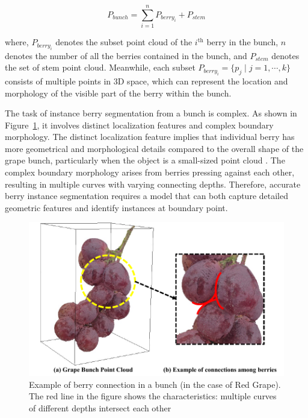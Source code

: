 \documentclass[12pt]{article}
\begin{document}
\begin{equation}
P_{bunch} = \sum_{i=1}^{n} P_{berry_{i}} + P_{stem}
\label{eq:1}
\end{equation}

{\raggedright where, $P_{berry_{i}}$ denotes the subset point cloud of the $i^{\text{th}}$ berry in the bunch, $n$ denotes the number of all the berries contained in the bunch, and $P_{stem}$ denotes the set of stem point cloud. 
Meanwhile, each subset $P_{berry_{i}}=\{p_j \mid j=1, \cdots, k\}$ consists of multiple points in 3D space, which can represent the location and morphology of the visible part of the berry within the bunch.}

The task of instance berry segmentation from a bunch is complex. 
As shown in Figure~\ref{fig:raw2}, it involves distinct localization features and complex boundary morphology. 
The distinct localization feature implies that individual berry has more geometrical and morphological details compared to the overall shape of the grape bunch, particularly when the object is a small-sized point cloud \citep{luo_infield_2022}. 
The complex boundary morphology arises from berries pressing against each other, resulting in multiple curves with varying connecting depths. 
Therefore, accurate berry instance segmentation requires a model that can both capture detailed geometric features and identify instances at boundary point. 

\begin{figure}[hbt!]
    \centering
    \includegraphics[width=1\textwidth]{figures/Figure5.pdf}
    \caption{Example of berry connection in a bunch (in the case of Red Grape). The red line in the figure shows the characteristics: multiple curves of different depths intersect each other}
    \label{fig:raw2}
\end{figure}
\end{document}
